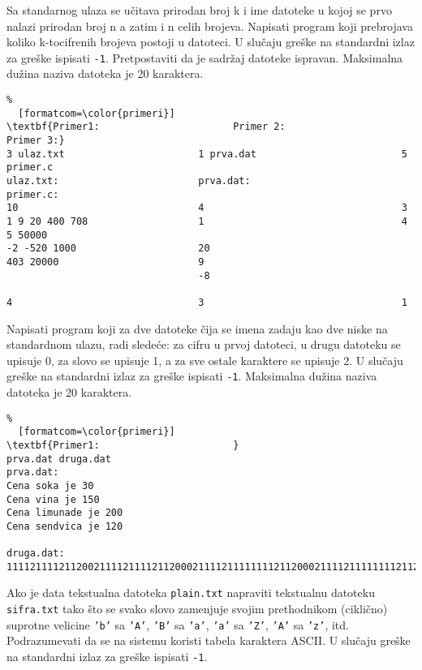 \documentclass{article}
\begin{document}
\begin{z}
Sa standarnog ulaza se u\v citava prirodan broj k i ime datoteke u kojoj se prvo nalazi
   prirodan broj n a zatim i n celih brojeva. Napisati program koji prebrojava
   koliko k-tocifrenih brojeva postoji u datoteci. U slu\v caju gre\v ske
na standardni izlaz za greške ispisati {\tt -1}. Pretpostaviti da je sadr\v zaj datoteke
   ispravan. Maksimalna du\v zina naziva datoteka je 20 karaktera.
\end{z}
\begin{Verbatim}%
  [formatcom=\color{primeri}]
\textbf{Primer1:                       Primer 2:                        Primer 3:}
3 ulaz.txt                       1 prva.dat                         5 primer.c        
ulaz.txt:                        prva.dat:                          primer.c:
10                               4                                  3
1 9 20 400 708                   1                                  4 5 50000
-2 -520 1000                     20
403 20000                        9
                                 -8
                                 
4                                3                                  1
\end{Verbatim} 

\begin{z}
Napisati program koji za dve datoteke čija se imena zadaju kao dve niske na standardnom ulazu, radi slede\'ce: za cifru u prvoj datoteci, u drugu
datoteku se upisuje 0, za slovo se upisuje 1, a za sve ostale karaktere se upisuje 2. U slu\v caju gre\v ske
na standardni izlaz za greške ispisati {\tt -1}. Maksimalna du\v zina naziva datoteka je 20 karaktera.
\end{z}
\begin{Verbatim}%
  [formatcom=\color{primeri}]
\textbf{Primer1:                       }
prva.dat druga.dat                   
prva.dat:                        
Cena soka je 30                  
Cena vina je 150                 
Cena limunade je 200             
Cena sendvica je 120             
                               
druga.dat:
11112111121120021111211112112000211112111111112112000211112111111112112000
\end{Verbatim}

\begin{z} Ako je data tekstualna datoteka \verb|plain.txt| napraviti tekstualnu
datoteku \verb|sifra.txt| tako \v sto se svako slovo zamenjuje svojim
prethodnikom (cikli\v cno) suprotne velicine \verb|’b’| sa \verb|’A’|,
\verb|’B’| sa \verb|’a’|, \verb|’a’| sa \verb|’Z’|, \verb|’A’| sa
\verb|’z’|, itd. Podrazumevati da se na sistemu koristi tabela
karaktera ASCII. U slu\v caju gre\v ske na standardni izlaz za greške ispisati {\tt -1}.
\end{z}
\end{document}
